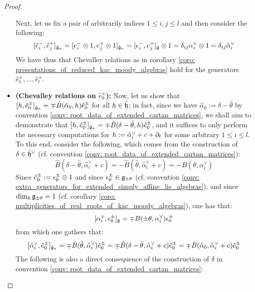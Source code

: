 \begin{proof}
\begin{itemize}
                            Next, let us fix a pair of arbitrarily indices $1 \leq i, j \leq l$ and then consider the following:
                                $$[\hat{e}_i^-, \hat{e}_j^+]_{\hat{\g}_{\kappa}} = [e_i^- \tensor 1, e_j^+ \tensor 1]_{\hat{\g}_{\kappa}} = [e_i^-, e_j^+]_{\g} \tensor 1 = \delta_{ij} \alpha_i^{\vee} \tensor 1 = \delta_{ij} \hat{\alpha}_i^{\vee}$$
                            We have thus that Chevalley relations as in corollary \ref{coro: presentations_of_reduced_kac_moody_algebras} hold for the generators $\hat{e}_1^{\pm}, ..., \hat{e}_l^{\pm}$.
                            
                            \item \textbf{(Chevalley relations on $\hat{e}_0^{\pm}$):} Now, let us show that $[h, \hat{e}_0^{\pm}]_{\hat{\mathfrak{g}}_{\kappa}} = \mp \hat{B}(\hat{\alpha}_0, h) \hat{e}_0^{\pm}$ for all $h \in \hat{\mathfrak{h}}$; in fact, since we have $\hat{\alpha}_0 := \delta - \hat{\theta}$ by convention \ref{conv: root_data_of_extended_cartan_matrices}, we shall aim to demonstrate that $[h, \hat{e}_0^{\pm}]_{\hat{\mathfrak{g}}_{\kappa}} = \mp \hat{B}(\delta - \hat{\theta}, h) \hat{e}_0^{\pm}$, and it suffices to only perform the necessary computations for $h := \hat{\alpha}_i^{\vee} + c + \partial_t$ for some arbitrary $1 \leq i \leq l$. To this end, consider the following, which comes from the construction of $\delta \in \hat{\mathfrak{h}}^{\vee}$ (cf. convention \ref{conv: root_data_of_extended_cartan_matrices}):
                                $$\hat{B}(\delta - \hat{\theta}, \hat{\alpha}_i^{\vee} + c) = -\hat{B}(\hat{\theta}, \hat{\alpha}_i^{\vee} + c) = -B(\theta, \alpha_i^{\vee})$$
                            Since $\hat{e}_0^{\pm} := \e_0^{\pm} \tensor 1$ and since $\epsilon_0^{\pm} \in \mathfrak{g}_{\pm \theta}$ (cf. convention \ref{conv: extra_generators_for_extended_simply_affine_lie_algebras}), and since $\dim_k \mathfrak{g}_{\pm \theta} = 1$ (cf. corollary \ref{coro: multiplicities_of_real_roots_of_kac_moody_algebras}), one has that:
                                $$[\alpha_i^{\vee}, \epsilon_0^{\pm}]_{\mathfrak{g}} = \mp B(\pm\theta, \alpha_i^{\vee}) \epsilon_0^{\pm}$$
                            from which one gathers that:
                                $$[\hat{\alpha}_i^{\vee}, \hat{e}_0^{\pm}]_{\hat{\mathfrak{g}}_{\kappa}} = \mp \hat{B}(\hat{\theta}, \hat{\alpha}_i^{\vee}) \hat{e}_0^{\pm} = \mp \hat{B}(\delta - \hat{\theta}, \hat{\alpha}_i^{\vee} + c) \hat{e}_0^{\pm} = \mp \hat{B}(\hat{\alpha}_0, \hat{\alpha}_i^{\vee} + c) \hat{e}_0^{\pm}$$
                            The following is also a direct consequence of the construction of $\delta$ in convention \ref{conv: root_data_of_extended_cartan_matrices}:

\end{itemize}
\end{proof}
